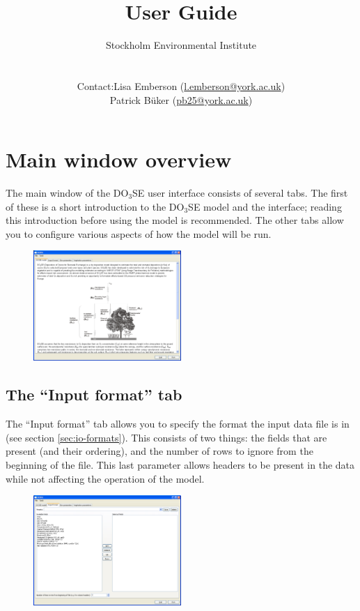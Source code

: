 \documentclass[10pt,a4paper]{article}
\title{\DOSE{} User Guide}
\author{Stockholm Environmental Institute\\
\\
\begin{tabular}{rl}
Contact: & Lisa Emberson (\href{mailto:l.emberson@york.ac.uk}{l.emberson@york.ac.uk})\\
         & Patrick B\"uker (\href{mailto:pb25@york.ac.uk}{pb25@york.ac.uk})
\end{tabular}
}
\date{}
\newcommand{\DOSE}{{DO$_3$SE}}
\begin{document}
\maketitle

\newpage

\tableofcontents

\newpage


\section{Main window overview}
\label{sec:overview}

The main window of the \DOSE{} user interface consists of several tabs.  The first of these is a 
short introduction to the \DOSE{} model and the interface; reading this introduction before using 
the model is recommended.  The other tabs allow you to configure various aspects of how the model 
will be run.

\begin{figure}[H]
\centering
\includegraphics[width=0.5\textwidth]{images/ss/intro-panel}
\end{figure}

\subsection{The ``Input format'' tab}
\label{sec:overview:input}

The ``Input format'' tab allows you to specify the format the input data file is in (see section 
\ref{sec:io-formats}).  This consists of two things: the fields that are present (and their 
ordering), and the number of rows to ignore from the beginning of the file.  This last parameter 
allows headers to be present in the data while not affecting the operation of the model.

\begin{figure}[H]
\centering
\includegraphics[width=0.5\textwidth]{images/ss/input-format-panel}
\end{figure}
\end{document}
